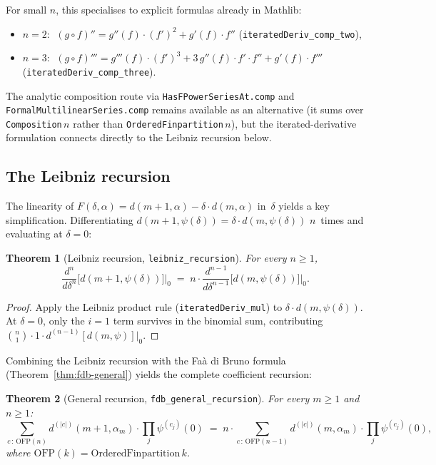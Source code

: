 \documentclass[11pt,a4paper]{article}
\theoremstyle{plain}
\newtheorem{theorem}{Theorem}[section]
\theoremstyle{definition}
\newcommand{\alpham}{\alpha_m}
\newcommand{\lean}[1]{\texttt{#1}}
\begin{document}
For small $n$, this specialises to explicit formulas already in Mathlib:

\begin{itemize}[nosep]
  \item $n = 2$: $\;(g \circ f)'' = g''(f) \cdot (f')^2 + g'(f) \cdot f''$
    \quad(\lean{iteratedDeriv\_comp\_two}),
  \item $n = 3$: $\;(g \circ f)''' = g'''(f) \cdot (f')^3 + 3\,g''(f) \cdot f' \cdot f'' + g'(f) \cdot f'''$
    \quad(\lean{iteratedDeriv\_comp\_three}).
\end{itemize}

\noindent
The analytic composition route via \lean{HasFPowerSeriesAt.comp}
and \lean{FormalMultilinearSeries.comp} remains available as an
alternative (it sums over \lean{Composition}\,$n$ rather than
\lean{OrderedFinpartition}\,$n$), but the iterated-derivative
formulation connects directly to the Leibniz recursion below.

\subsection{The Leibniz recursion}

The linearity of $F(\delta, \alpha) = d(m{+}1,\alpha) - \delta \cdot d(m,\alpha)$
in~$\delta$ yields a key simplification.  Differentiating
$d(m{+}1, \psi(\delta)) = \delta \cdot d(m, \psi(\delta))$
$n$~times and evaluating at $\delta = 0$:

\begin{theorem}[Leibniz recursion, \lean{leibniz\_recursion}]
\label{thm:leibniz}
For every $n \ge 1$,
\[
  \frac{d^n}{d\delta^n}\bigl[d(m{+}1, \psi(\delta))\bigr]\big|_0
  \;=\; n \cdot
  \frac{d^{n-1}}{d\delta^{n-1}}\bigl[d(m, \psi(\delta))\bigr]\big|_0.
\]
\end{theorem}

\begin{proof}
Apply the Leibniz product rule (\lean{iteratedDeriv\_mul}) to
$\delta \cdot d(m, \psi(\delta))$.  At $\delta = 0$, only the
$i = 1$ term survives in the binomial sum, contributing
$\binom{n}{1} \cdot 1 \cdot d^{(n-1)}[d(m,\psi)]|_0$.
\end{proof}

Combining the Leibniz recursion with the Fa\`a di Bruno formula
(Theorem~\ref{thm:fdb-general}) yields the complete coefficient
recursion:

\begin{theorem}[General recursion, \lean{fdb\_general\_recursion}]
\label{thm:general-recursion}
For every $m \ge 1$ and $n \ge 1$:
\[
  \sum_{c \,:\, \mathrm{OFP}(n)}
  d^{(|c|)}(m{+}1, \alpham) \cdot \prod_{j} \psi^{(c_j)}(0)
  \;=\; n \cdot
  \sum_{c \,:\, \mathrm{OFP}(n{-}1)}
  d^{(|c|)}(m, \alpham) \cdot \prod_{j} \psi^{(c_j)}(0),
\]
where $\mathrm{OFP}(k) = \mathrm{OrderedFinpartition}\,k$.
\end{theorem}
\end{document}
